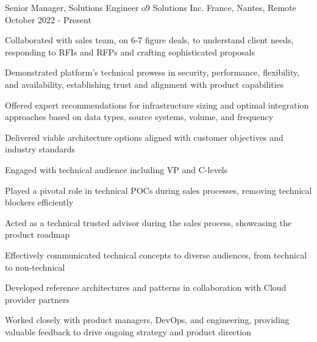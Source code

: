 

\begin{cventries}

  \cventry
    {Senior Manager, Solutions Engineer}
    {o9 Solutions Inc.}
    {France, Nantes, Remote}
    {October 2022 - Present}
    {
      \begin{cvitems}
        \item {Collaborated with sales team, on 6-7 figure deals, to understand client needs, responding to RFIs and RFPs and crafting sophisticated proposals}
        \item {Demonstrated platform's technical prowess in security, performance, flexibility, and availability, establishing trust and alignment with product capabilities}
        \item {Offered expert recommendations for infrastructure sizing and optimal integration approaches based on data types, source systems, volume, and frequency}
        \item {Delivered viable architecture options aligned with customer objectives and industry standards}
        \item {Engaged with technical audience including VP and C-levels}
        \item {Played a pivotal role in technical POCs during sales processes, removing technical blockers efficiently}
        \item {Acted as a technical trusted advisor during the sales process, showcasing the product roadmap}
        \item {Effectively communicated technical concepts to diverse audiences, from technical to non-technical}
        \item {Developed reference architectures and patterns in collaboration with Cloud provider partners}
        \item {Worked closely with product managers, DevOps, and engineering, providing valuable feedback to drive ongoing strategy and product direction}
      \end{cvitems}
    }


\end{cventries}
